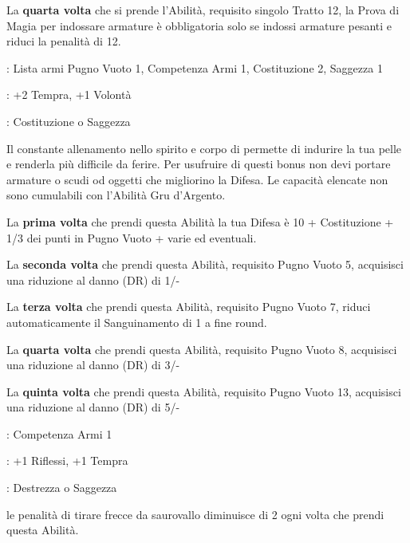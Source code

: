 \begin{multicols}{2}
La \textbf{quarta volta} che si prende l'Abilità, requisito singolo Tratto 12, la Prova di Magia per indossare armature è obbligatoria solo se indossi armature pesanti e riduci la penalità di 12.

\begin{description}[noitemsep, topsep=0pt, parsep=0pt, partopsep=0pt, leftmargin=0cm, labelwidth=2.5cm]
    \item[\textbf{Requisito}]: Lista armi Pugno Vuoto 1, Competenza Armi 1, Costituzione 2, Saggezza 1
    \item[\textbf{Tiri Salvezza}]: +2 Tempra, +1 Volontà
    \item[\textbf{Caratteristica}]: Costituzione o Saggezza
\end{description}

Il constante allenamento nello spirito e corpo di permette di indurire la tua pelle e renderla più difficile da ferire. Per usufruire di questi bonus non devi portare armature o scudi od oggetti che migliorino la Difesa. Le capacità elencate non sono cumulabili con l'Abilità Gru d'Argento.

La \textbf{prima volta} che prendi questa Abilità la tua Difesa è 10 + Costituzione + 1/3 dei punti in Pugno Vuoto + varie ed eventuali.

La \textbf{seconda volta} che prendi questa Abilità, requisito Pugno Vuoto 5, acquisisci una riduzione al danno (DR) di 1/-

La \textbf{terza volta} che prendi questa Abilità, requisito Pugno Vuoto 7, riduci automaticamente il Sanguinamento di 1 a fine round.

La \textbf{quarta volta} che prendi questa Abilità, requisito Pugno Vuoto 8, acquisisci una riduzione al danno (DR) di 3/-

La \textbf{quinta volta} che prendi questa Abilità, requisito Pugno Vuoto 13, acquisisci una riduzione al danno (DR) di 5/-

\begin{description}[noitemsep, topsep=0pt, parsep=0pt, partopsep=0pt, leftmargin=0cm, labelwidth=2.5cm]
    \item[\textbf{Requisito}]: Competenza Armi 1
    \item[\textbf{Tiri Salvezza}]: +1 Riflessi, +1 Tempra
    \item[\textbf{Caratteristica}]: Destrezza o Saggezza
\end{description}

le penalità di tirare frecce da saurovallo diminuisce di 2 ogni volta che prendi questa Abilità.


\end{multicols}
